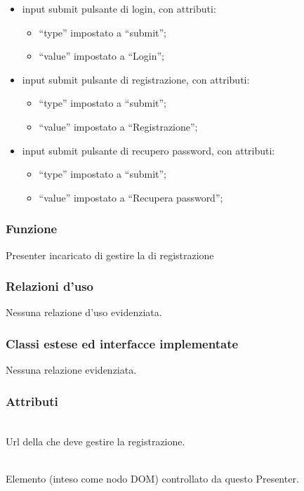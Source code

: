 \begin{description}
\begin{itemize}
\begin{itemize}
		\end{itemize}		
		\item input submit pulsante di login, con attributi:
		\begin{itemize}
			\item ``type'' impostato a ``submit'';
			\item ``value'' impostato a ``Login'';
		\end{itemize}
		\item input submit pulsante di registrazione, con attributi:
		\begin{itemize}
			\item ``type'' impostato a ``submit'';
			\item ``value'' impostato a ``Registrazione'';
		\end{itemize}
		\item input submit pulsante di recupero password, con attributi:
		\begin{itemize}
			\item ``type'' impostato a ``submit'';
			\item ``value'' impostato a ``Recupera password'';
		\end{itemize}
	\end{itemize}

\end{description}


\subsubsection*{Funzione}
Presenter incaricato di gestire la  di registrazione

\subsubsection*{Relazioni d'uso}

Nessuna relazione d'uso evidenziata.

\subsubsection*{Classi estese ed interfacce implementate}

Nessuna relazione evidenziata.

\subsubsection*{Attributi}
\begin{description}

  \item{}\\
  Url della  che deve gestire la registrazione.
  \item{}\\
  Elemento (inteso come nodo DOM) controllato da questo Presenter.

\end{description}

